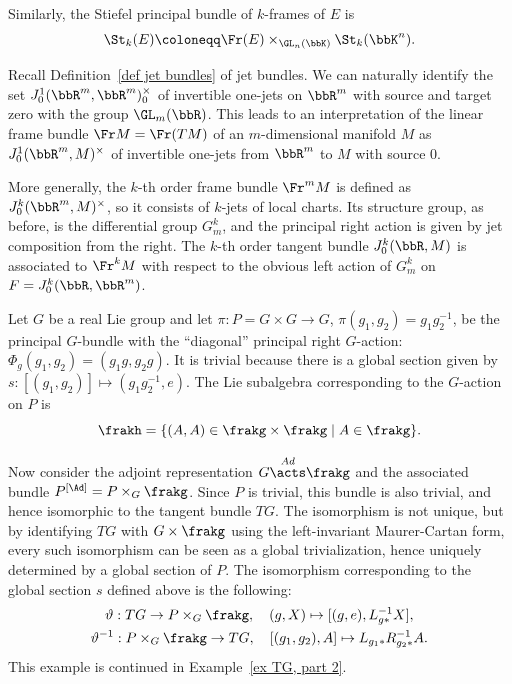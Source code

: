 \begin{example}
\begin{enumerate}
        Similarly, the Stiefel principal bundle of $k$-frames of $E$ is
        \[\St_k(E)\coloneqq \Fr(E)\times_{\GL_n(\bbK)}\St_k(\bbK^n).\]
    \end{enumerate}
\end{example}

\begin{example}
    Recall Definition~\ref{def jet bundles} of jet bundles. We can naturally identify the set $J^1_0(\bbR^m,\bbR^m)_0^\times$ of invertible one-jets on $\bbR^m$ with source and target zero with the group $\GL_m(\bbR)$. This leads to an interpretation of the linear frame bundle $\Fr M=\Fr(TM)$ of an $m$-dimensional manifold $M$ as $J^1_0(\bbR^m,M)^\times$ of invertible one-jets from $\bbR^m$ to $M$ with source $0$.

    More generally, the $k$-th order frame bundle $\Fr^mM$ is defined as $J^k_0(\bbR^m,M)^\times$, so it consists of $k$-jets of local charts. Its structure group, as before, is the differential group $G^k_m$, and the principal right action is given by jet composition from the right. The $k$-th order tangent bundle $J^k_0(\bbR,M)$ is associated to $\Fr^k M$ with respect to the obvious left action of $G^k_m$ on $F=J^k_0(\bbR,\bbR^m)$.
\end{example}


\begin{example}\label{ex TG, part 1}
    Let $G$ be a real Lie group and let $\pi:P=G\times G\to G$, $\pi(g_1,g_2)=g_1g_2^{-1}$, be the principal $G$-bundle with the ``diagonal'' principal right $G$-action: $\Phi_g(g_1,g_2)=(g_1g,g_2g)$.  It is trivial because there is a global section given by $s:[(g_1,g_2)]\mapsto (g_1g_2^{-1},e)$. The Lie subalgebra corresponding to the $G$-action on $P$ is 
    \[\frakh=\{(A,A)\in \frakg\times\frakg\mid A\in\frakg\}.\]

    Now consider the adjoint representation $G\overset{Ad}{\acts}\frakg$ and the associated bundle $P^{[\Ad]}=P\times_G \frakg$. Since $P$ is trivial, this bundle is also trivial, and hence isomorphic to the tangent bundle $TG$. The isomorphism is not unique, but by identifying $TG$ with $G\times\frakg$ using the left-invariant Maurer-Cartan form, every such isomorphism can be seen as a global trivialization, hence uniquely determined by a global section of $P$. The isomorphism corresponding to the global section $s$ defined above is the following:
    \begin{gather}
    	\vartheta: TG\to P \times_G \frakg,\quad (g,X)\mapsto [(g,e),L_{g\ast}^{-1}X],\\
    	\vartheta^{-1}: P\times_G \frakg\to TG,\quad [(g_1,g_2),A]\mapsto L_{g_1\ast}R_{g_2\ast}^{-1}  A.
    \end{gather}
    This example is continued in Example~\ref{ex TG, part 2}.
\end{example}


